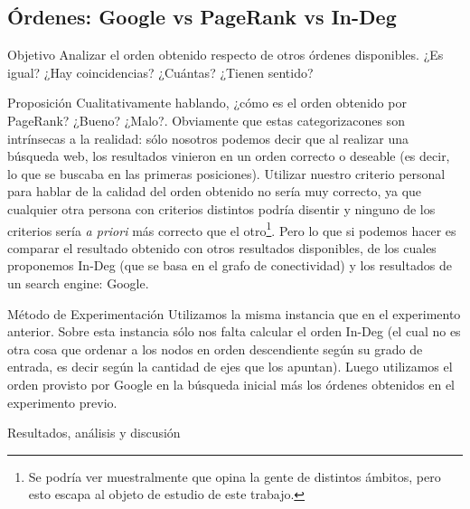 \subsection{\'Ordenes: Google vs PageRank vs In-Deg}
\label{subsec:exp2}
\begin{LaTeXdescription}
    \item[Objetivo] Analizar el orden obtenido respecto de otros \'ordenes
        disponibles. ¿Es igual? ¿Hay coincidencias? ¿Cu\'antas? ¿Tienen sentido?

    \item[Proposici\'on] Cualitativamente hablando, ¿c\'omo es el orden obtenido
        por PageRank? ¿Bueno? ¿Malo?. Obviamente que estas categorizacones son
        intr\'insecas a la realidad: s\'olo nosotros podemos decir que al
        realizar una b\'usqueda web, los resultados vinieron en un orden
        correcto o deseable (es decir, lo que se buscaba en las primeras
        posiciones).  Utilizar nuestro criterio personal para hablar de la
        calidad del orden obtenido no ser\'ia muy correcto, ya que cualquier
        otra persona con criterios distintos podr\'ia disentir y ninguno de los
        criterios ser\'ia \textit{a priori} m\'as correcto que el
        otro\footnote{Se podr\'ia ver muestralmente que opina la gente de
        distintos \'ambitos, pero esto escapa al objeto de estudio de este
        trabajo.}. Pero lo que si podemos hacer es comparar el resultado
        obtenido con otros resultados disponibles, de los cuales proponemos
        In-Deg (que se basa en el grafo de conectividad) y los resultados de un
        search engine: Google.

    \item[M\'etodo de Experimentaci\'on] Utilizamos la misma instancia que en el
        experimento anterior. Sobre esta instancia s\'olo nos falta calcular el
        orden In-Deg (el cual no es otra cosa que ordenar a los nodos en orden
        descendiente seg\'un su grado de entrada, es decir seg\'un la cantidad
        de ejes que los apuntan). Luego utilizamos el orden provisto por Google
        en la b\'usqueda inicial m\'as los \'ordenes obtenidos en el experimento
        previo.

    \item[Resultados, an\'alisis y discusi\'on]
\end{LaTeXdescription}

